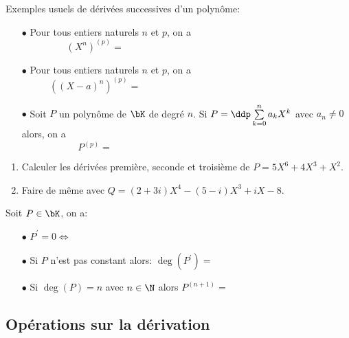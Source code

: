 \documentclass[a4paper, 11pt,reqno]{article}
\begin{document}
{\noindent

	\begin{prop} Exemples usuels de d\'eriv\'ees successives d'un polyn\^{o}me:
		\begin{itemize}
			\item[$\bullet$] Pour tous entiers naturels $n$ et $p$, on a
			      $$(X^n)^{(p)}= \hspace{8cm}  $$
			\item[$\bullet$] Pour tous entiers naturels $n$ et $p$, on a
			      $$((X-a)^n)^{(p)}= \hspace{8cm}  $$
			\item[$\bullet$] Soit $P$ un polyn\^ome de $\bK$ de degr\'e $n$. Si $P=\ddp\sum\limits_{k=0}^n a_kX^k$ avec $a_n\not= 0$ alors, on a
			      $$P^{(p)}= \hspace{8cm}  $$
		\end{itemize}
	\end{prop}
}

{\footnotesize \begin{exercice}
		\begin{enumerate}
			\item Calculer les d\'eriv\'ees premi\`{e}re, seconde et troisi\`{e}me de $P=5X^6+4X^3+X^2$.
			\item Faire de m\^{e}me avec $Q=(2+3i)X^4-(5-i)X^3+iX-8$.
		\end{enumerate}
	\end{exercice}
}\vsec

% 


\begin{prop}
	Soit $P\in\bK$, on a:\vsec
	\begin{itemize}
		\item[$\bullet$] $P^{\prime}=0\Longleftrightarrow$ \dotfill \vsec
		\item[$\bullet$]  Si $P$ n'est pas constant alors: $\deg(P^{\prime})=$\dotfill\vsec
		\item[$\bullet$]  Si $\deg(P)=n$ avec $n\in\N$ alors $P^{(n+1)} = $\dotfill \vsec
	\end{itemize}
\end{prop}




\subsection{Op\'erations sur la d\'erivation}%
\end{document}
